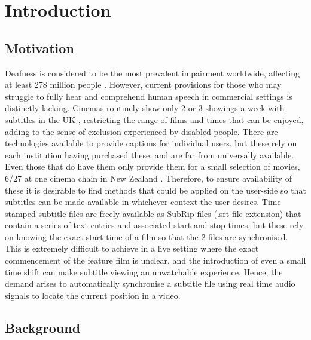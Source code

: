 
\chapter{Introduction} %

\label{Chapter1} %


\section{Motivation}

Deafness is considered to be the most prevalent impairment worldwide, affecting at least 278 million people \cite{Tucci2010}. However, current provisions for those who may struggle to fully hear and comprehend human speech in commercial settings is distinctly lacking. Cinemas routinely show only 2 or 3 showings a week with subtitles in the UK \cite{subtitledshows},  restricting the range of films and times that can be enjoyed, adding to the sense of exclusion experienced by disabled people. There are technologies available to provide captions for individual users\cite{dolbysubs}, but these rely on each institution having purchased these, and are far from universally available. Even those that do have them only provide them for a small selection of movies, 6/27 at one cinema chain in New Zealand \cite{hoyts}. Therefore, to ensure availability of these it is desirable to find methods that could be applied on the user-side so that subtitles can be made available in whichever context the user desires. Time stamped subtitle files are freely available as SubRip files (.srt file extension) that contain a series of text entries and associated start and stop times, but these rely on knowing the exact start time of a film so that the 2 files are synchronised. This is extremely difficult to achieve in a live setting where the exact commencement of the feature film is unclear, and the introduction of even a small time shift can make subtitle viewing an unwatchable experience. Hence, the demand arises to automatically synchronise a subtitle file using real time audio signals to locate the current position in a video.

\section{Background}

